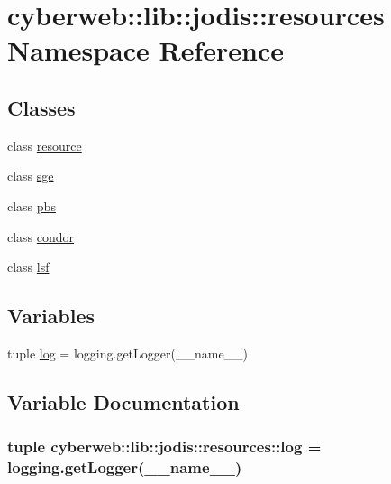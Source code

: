 \hypertarget{namespacecyberweb_1_1lib_1_1jodis_1_1resources}{\section{cyberweb\-:\-:lib\-:\-:jodis\-:\-:resources \-Namespace \-Reference}
\label{namespacecyberweb_1_1lib_1_1jodis_1_1resources}
}
\subsection*{\-Classes}
\begin{DoxyCompactItemize}
\item 
class \hyperlink{classcyberweb_1_1lib_1_1jodis_1_1resources_1_1resource}{resource}
\item 
class \hyperlink{classcyberweb_1_1lib_1_1jodis_1_1resources_1_1sge}{sge}
\item 
class \hyperlink{classcyberweb_1_1lib_1_1jodis_1_1resources_1_1pbs}{pbs}
\item 
class \hyperlink{classcyberweb_1_1lib_1_1jodis_1_1resources_1_1condor}{condor}
\item 
class \hyperlink{classcyberweb_1_1lib_1_1jodis_1_1resources_1_1lsf}{lsf}
\end{DoxyCompactItemize}
\subsection*{\-Variables}
\begin{DoxyCompactItemize}
\item 
tuple \hyperlink{namespacecyberweb_1_1lib_1_1jodis_1_1resources_ae71d8c3eec6f4e3af2af957bd30f9f30}{log} = logging.\-get\-Logger(\-\_\-\-\_\-name\-\_\-\-\_\-)
\end{DoxyCompactItemize}


\subsection{\-Variable \-Documentation}
\hypertarget{namespacecyberweb_1_1lib_1_1jodis_1_1resources_ae71d8c3eec6f4e3af2af957bd30f9f30}{
\subsubsection[{log}]{\setlength{\rightskip}{0pt plus 5cm}tuple {\bf cyberweb\-::lib\-::jodis\-::resources\-::log} = logging.\-get\-Logger(\-\_\-\-\_\-name\-\_\-\-\_\-)}}\label{namespacecyberweb_1_1lib_1_1jodis_1_1resources_ae71d8c3eec6f4e3af2af957bd30f9f30}
